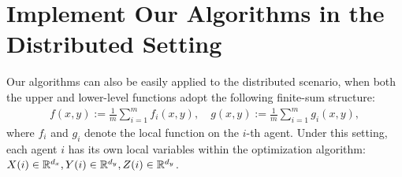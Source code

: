 \section{Implement Our Algorithms in the Distributed Setting} \label{apx:dist}

Our algorithms can also be easily applied to the distributed scenario, when both the upper and lower-level functions adopt the following finite-sum structure:
\begin{align}  \label{prob:fn}
    f(x,y) := \frac{1}{m} \sum_{i=1}^m f_i(x,y), \quad g(x,y) := \frac{1}{m} \sum_{i=1}^m g_i(x,y),
\end{align}
where $f_i$ and $g_i$ denote the local function on the $i$-th agent. 
Under this setting, each agent $i$ has its own local variables within the optimization algorithm: $X(i) \in {\mathbb{R}}^{d_x}, Y(i) \in {\mathbb{R}}^{d_y},Z(i) \in {\mathbb{R}}^{d_y}$.
